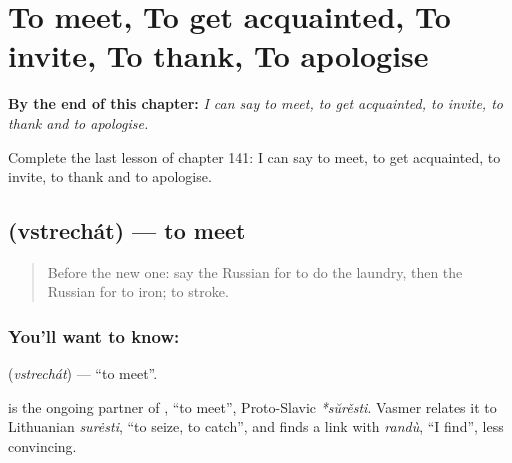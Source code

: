 
\chapter{To meet, To get acquainted, To invite, To thank, To apologise}
\label{ch:ru-to-meet-to-get-acquainted-to-invite-to-thank-to-apologise}

\begin{chapteropening}
\textbf{By the end of this chapter:} \emph{I can say to meet, to get acquainted, to invite, to thank and to apologise.}

Complete the last lesson of chapter 141: I can say to meet, to get acquainted, to invite, to thank and to apologise.
\end{chapteropening}

\section[\texorpdfstring{\ru{встречать} (vstrechát)}{встречать (vstrechát)}]{ (vstrechát) — to meet}

\label{lesson:RU-C141-vstrechat}



\begin{quote}
Before the new one: say the Russian for to do the laundry, then the Russian for to iron; to stroke.
\end{quote}

\subsection*{You'll want to know: }
\textbf{} (\emph{vstrechát}) — \textquotedblleft{}to meet\textquotedblright{}.

\begin{cousinweb}
\textbf{} is the ongoing partner of \emph{}, \textquotedblleft{}to meet\textquotedblright{}, Proto-Slavic \emph{*sŭrěsti}. Vasmer relates it to Lithuanian \emph{surėsti}, \textquotedblleft{}to seize, to catch\textquotedblright{}, and finds a link with \emph{randù}, \textquotedblleft{}I find\textquotedblright{}, less convincing.
\end{cousinweb}

